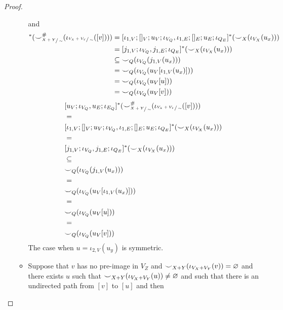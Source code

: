 \begin{proof}
\begin{enumerate}
\begin{itemize}
        and
        \ifdefined \ONECOLUMN
        \begin{align*}
            [u_{V};\iota_{V_{Q}}, u_{E};\iota_{E_{Q}}]^{*}(\consistency_{\sfrac{X+Y}{\sim}}^{\hashtag}(\iota_{\sfrac{V_{X} + V_{Y}}{\sim}}([v])))
            &=
            [\iota_{1,V};[]_{V};u_{V};\iota_{V_{Q}},\iota_{1,E};[]_{E};u_{E};\iota_{Q_{E}}]^{*}(\consistency_{X}(\iota_{V_{X}}(u_{x})))\\
            &=
            [j_{1,V};\iota_{V_{Q}},j_{1,E};\iota_{Q_{E}}]^{*}(\consistency_{X}(\iota_{V_{X}}(u_{x})))\\
            &\subseteq
            \consistency_{Q}(\iota_{V_{Q}}(j_{1,V}(u_{x})))\\
            &=
            \consistency_{Q}(\iota_{V_{Q}}(u_{V}[\iota_{1,V}(u_{x})]))\\
            &=
            \consistency_{Q}(\iota_{V_{Q}}(u_{V}[u]))\\
            &=
            \consistency_{Q}(\iota_{V_{Q}}(u_{V}[v]))
        \end{align*}
        \else
        \begin{align*}
            &[u_{V};\iota_{V_{Q}}, u_{E};\iota_{E_{Q}}]^{*}({\smile}_{\sfrac{X+Y}{\sim}}^{{\#}}(\iota_{\sfrac{V_{X} + V_{Y}}{\sim}}([v])))\\
            &=\\
            &[\iota_{1,V};[]_{V};u_{V};\iota_{V_{Q}},\iota_{1,E};[]_{E};u_{E};\iota_{Q_{E}}]^{*}({\smile}_{X}(\iota_{V_{X}}(u_{x})))\\
            &=\\
            &[j_{1,V};\iota_{V_{Q}},j_{1,E};\iota_{Q_{E}}]^{*}({\smile}_{X}(\iota_{V_{X}}(u_{x})))\\
            &\subseteq\\
            &{\smile}_{Q}(\iota_{V_{Q}}(j_{1,V}(u_{x})))\\
            &=\\
            &{\smile}_{Q}(\iota_{V_{Q}}(u_{V}[\iota_{1,V}(u_{x})]))\\
            &=\\
            &{\smile}_{Q}(\iota_{V_{Q}}(u_{V}[u]))\\
            &=\\
            &{\smile}_{Q}(\iota_{V_{Q}}(u_{V}[v]))
        \end{align*}
        \fi
        The case when $u = \iota_{2,V}(u_{y})$ is symmetric.
        \item Suppose that $v$ has no pre-image in $V_{Z}$ and ${\smile}_{X+Y}(\iota_{V_{X} + V_{Y}}(v)) = \varnothing$ and there exists $u$ such that ${\smile}_{X+Y}(\iota_{V_{X} + V_{Y}}(u)) \not = \varnothing$ and such that there is an undirected path from $[v]$ to $[u]$ and then

\end{itemize}
\end{enumerate}
\end{proof}

